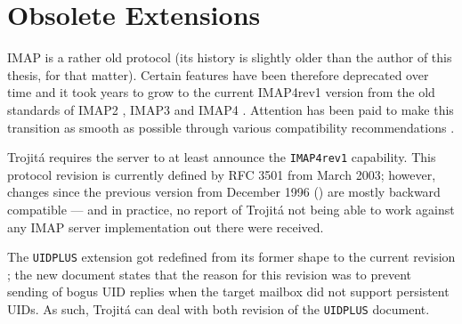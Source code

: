 \documentclass[trojita]{subfiles}
\begin{document}
\section{Obsolete Extensions}

IMAP is a rather old protocol (its history is slightly older than the author of this thesis, for that matter).  Certain
features have been therefore deprecated over time and it took years to grow to the current IMAP4rev1 version from the
old standards of IMAP2 \cite{rfc1064} \cite{rfc1176}, IMAP3 \cite{rfc1203} and IMAP4 \cite{rfc1730}.  Attention has been
paid to make this transition as smooth as possible through various compatibility recommendations \cite{rfc1732}
\cite{rfc2060} \cite{rfc2061} \cite{rfc2062}.

Trojitá requires the server to at least announce the {\tt IMAP4rev1} capability.  This protocol revision is currently
defined by RFC 3501 \cite{rfc3501} from March 2003; however, changes since the previous version from December 1996
(\cite{rfc2060}) are mostly backward compatible --- and in practice, no report of Trojitá not being able to work against
any IMAP server implementation out there were received.

The {\tt UIDPLUS} extension got redefined from its former shape \cite{rfc2359} to the current revision \cite{rfc4315};
the new document states that the reason for this revision was to prevent sending of bogus UID replies when the target
mailbox did not support persistent UIDs.  As such, Trojitá can deal with both revision of the {\tt UIDPLUS} document.
\end{document}
